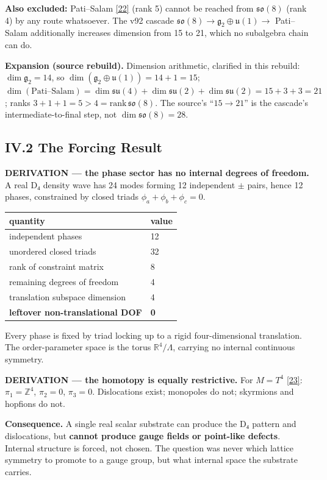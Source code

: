 \documentclass[a4paper,11pt]{article}
\newcommand{\expansion}[1]{\par\smallskip\noindent\textbf{Expansion (source rebuild).} #1\par\smallskip}
\begin{document}
\textbf{Also excluded:} Pati–Salam \hyperref[ref22]{[22]} (rank 5) cannot be reached from $\mathfrak{so}(8)$ (rank 4) by any route whatsoever. The v92 cascade $\mathfrak{so}(8)\to\mathfrak{g}_2\oplus\mathfrak{u}(1)\to$ Pati–Salam additionally increases dimension from 15 to 21, which no subalgebra chain can do.


\expansion{Dimension arithmetic, clarified in this rebuild: $\dim\mathfrak{g}_2 = 14$, so $\dim(\mathfrak{g}_2 \oplus \mathfrak{u}(1)) = 14 + 1 = 15$; $\dim(\text{Pati--Salam}) = \dim\mathfrak{su}(4) + \dim\mathfrak{su}(2) + \dim\mathfrak{su}(2) = 15 + 3 + 3 = 21$; ranks $3 + 1 + 1 = 5 > 4 = \mathrm{rank}\,\mathfrak{so}(8)$. The source's ``$15 \to 21$'' is the cascade's intermediate-to-final step, not $\dim\mathfrak{so}(8) = 28$.}
\subsection*{IV.2 The Forcing Result}

\textbf{DERIVATION — the phase sector has no internal degrees of freedom.} A real D₄ density wave has 24 modes forming 12 independent $\pm$ pairs, hence 12 phases, constrained by closed triads $\phi_a+\phi_b+\phi_c=0$.

\begin{center}
\begin{tabular}{ll}
\hline
quantity & value \\
\hline
independent phases & 12 \\
unordered closed triads & 32 \\
rank of constraint matrix & 8 \\
remaining degrees of freedom & 4 \\
translation subspace dimension & 4 \\
\textbf{leftover non-translational DOF} & \textbf{0} \\
\hline
\end{tabular}
\end{center}

Every phase is fixed by triad locking up to a rigid four-dimensional translation. The order-parameter space is the torus $\mathbb{R}^4/\Lambda$, carrying no internal continuous symmetry.

\textbf{DERIVATION — the homotopy is equally restrictive.} For $M=T^4$ \hyperref[ref23]{[23]}: $\pi_1=\mathbb{Z}^4$, $\pi_2=0$, $\pi_3=0$. Dislocations exist; monopoles do not; skyrmions and hopfions do not.

\textbf{Consequence.} A single real scalar substrate can produce the D₄ pattern and dislocations, but \textbf{cannot produce gauge fields or point-like defects}. Internal structure is forced, not chosen. The question was never which lattice symmetry to promote to a gauge group, but what internal space the substrate carries.
\end{document}
